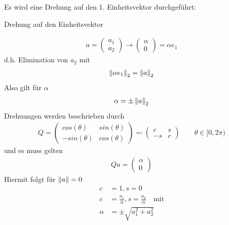 Es wird eine Drehung auf den 1. Einheitsvektor durchgeführt:
\begin{image}{Drehung auf den Einheitsvektor}
    \label{im4.4.a}
\end{image}
\begin{gather*}
  a=\begin{pmatrix}a_1 \\ a_2\end{pmatrix} \rightarrow \begin{pmatrix}\alpha \\ 0 \end{pmatrix}
  = \alpha e_1
\end{gather*}
d.h. Elimination von $a_2$ mit
\begin{gather*}
  \nn[\alpha e_1]_2 = \nn[a]_2
\end{gather*}
Also gilt für $\alpha$
\begin{gather*}
  \alpha=\pm \nn[a]_2
\end{gather*}
Drehuungen werden beschrieben durch
\begin{gather*}
  Q = \begin{pmatrix}
    cos(\theta) & sin(\theta)\\
    -sin(\theta) & cos(\theta)
  \end{pmatrix}
  \eqqcolon \begin{pmatrix}
    c & s\\
    -s & c
  \end{pmatrix}\qquad \theta \in[0,2\pi)
\end{gather*}
und es muss gelten
\begin{gather*}
  Qa = \begin{pmatrix}\alpha \\ 0 \end{pmatrix}
\end{gather*}
Hiermit folgt für $\nn[a]= 0$
\begin{align}
  \nonumber
  c&=1, s=0\\ \nonumber
  c&=\frac{a_1}{\alpha},  s= \frac{a_2}{\alpha}\quad \text{mit}\\
  \alpha & = \pm \sqrt{a_1^2+a_2^2}
           \label{IV.4.4}
\end{align}
